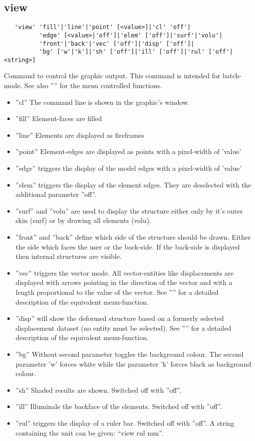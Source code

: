 \documentclass{article}
\begin{document}
\subsection{\label{view}view}
\begin{verbatim}
   'view' 'fill'|'line'|'point' [<value>]|'cl' 'off'|
          'edge' [<value>|'off']|'elem' ['off']|'surf'|'volu'|
          'front'|'back'|'vec' ['off']|'disp' ['off']|
          'bg' ['w'|'k']|'sh' ['off']|'ill' ['off']|'rul' ['off'|<string>]
\end{verbatim}
Command to control the graphic output. This command is intended for batch-mode. See also '''' for the menu controlled functions.
\begin{itemize}
\item ''cl'' The command line is shown in the graphic's window. 
\item ''fill'' Element-faces are filled 
\item ''line'' Elements are displayed as fireframes
\item ''point'' Element-edges are displayed as points with a pixel-width of 'value'
\item ''edge'' triggers the display of the model edges with a pixel-width of 'value'
\item ''elem'' triggers the display of the element edges. They are deselected with the additional parameter ''off''.
\item ''surf'' and ''volu'' are used to display the structure either only by it's outer skin (surf) or by drawing all elements (volu). \item ''front'' and ''back'' define which side of the structure should be drawn. Either the side which faces the user or the back-side. If the back-side is displayed then internal structures are visible. 
\item ''vec'' triggers the vector mode. All vector-entities like displacements are displayed with arrows pointing in the direction of the vector and with a length proportional to the value of the vector. See '''' for a detailed description of the equivalent menu-function.
\item ''disp'' will show the deformed structure based on a formerly selected displacement dataset (no entity must be selected). See '''' for a detailed description of the equivalent menu-function.
\item ''bg'' Without second parameter toggles the background colour. The second parameter 'w' forces white while the parameter 'k' forces black as background colour.
\item ''sh'' Shaded results are shown. Switched off with ''off''. 
\item ''ill'' Illuminale the backface of the elements. Switched off with ''off''. 
\item ''rul'' triggers the display of a ruler bar. Switched off with ''off''. A string containing the unit can be given: ``view rul mm''. 
\end{itemize}  
\end{document}
